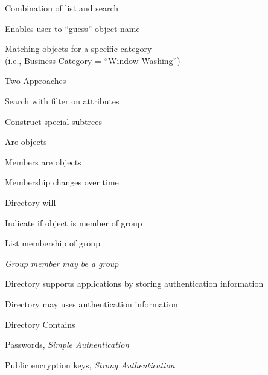 \begin{bwslide}

\begin{nrtc}
\item	Combination of list and search
\item	Enables user to ``guess'' object name
\end{nrtc}
\end{bwslide}

\begin{bwslide}

\begin{nrtc}
\item	Matching objects for a specific category\\
	(i.e., Business Category = ``Window Washing'')
\item	Two Approaches
	\begin{nrtc}
	\item	Search with filter on attributes
	\item	Construct special subtrees
	\end{nrtc}
\end{nrtc}
\end{bwslide}

\begin{bwslide}

\begin{nrtc}
\item	Are objects
\item	Members are objects
\item	Membership changes over time
\item	Directory will
	\begin{nrtc}
	\item	Indicate if object is member of group
	\item	List membership of group
	\end{nrtc}
\item	{\em Group member may be a group}
\end{nrtc}
\end{bwslide}

\begin{bwslide}

\begin{nrtc}
\item	Directory supports applications by storing authentication information
\item	Directory may uses authentication information
\item	Directory Contains
	\begin{nrtc}
	\item	Passwords, {\em Simple Authentication} 
	\item	Public encryption keys, {\em Strong Authentication}
	\end{nrtc}
\end{nrtc}
\end{bwslide}

